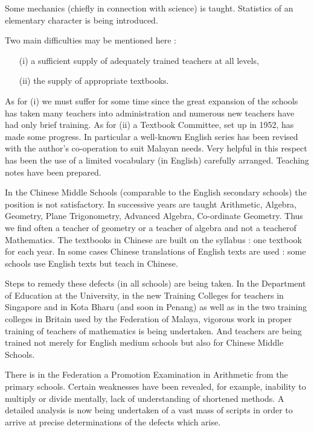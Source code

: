 \newpage

Some mechanics (chiefly in connection with science) is taught. Statistics of an elementary character is being introduced.

Two main difficulties may be mentioned here :
\begin{itemize}
\item[(i)] a sufficient supply of adequately trained teachers at all levels,

\item[(ii)] the supply of appropriate textbooks.
\end{itemize}

As for (i) we must suffer for some time since the great expansion of the schools has taken many teachers into administration and numerous new teachers have had only brief training. As for (ii) a Textbook Committee, set up in 1952, has made some progress. In particular a well-known English series has been revised with the author's co-operation to suit Malayan needs. Very helpful in this respect has been the use of a limited vocabulary (in English) carefully arranged. Teaching notes have been prepared.

In the Chinese Middle Schools (comparable to the English secondary schools) the position is not satisfactory. In successive years are taught Arithmetic, Algebra, Geometry, Plane Trigonometry, Advanced Algebra, Co-ordinate Geometry. Thus we find often a teacher of geometry or a teacher of algebra and not a teacher\pageoriginale of Mathematics. The textbooks in Chinese are built on the syllabus : one textbook for each year. In some cases Chinese translations of English texts are used : some schools use English texts but teach in Chinese.

Steps to remedy these defects (in all schools) are being taken. In the Department of Education at the University, in the new Training Colleges for teachers in Singapore and in Kota Bharu (and soon in Penang) as well as in the two training colleges in Britain used by the Federation of Malaya, vigorous work in proper training of teachers of mathematics is being undertaken. And teachers are being trained not merely for English medium schools but also for Chinese Middle Schools.

There is in the Federation a Promotion Examination in Arithmetic from the primary schools. Certain weaknesses have been revealed, for example, inability to multiply or divide mentally, lack of understanding of shortened methods. A detailed analysis is now being undertaken of a vast mass of scripts in order to arrive at precise determinations of the defects which arise.

